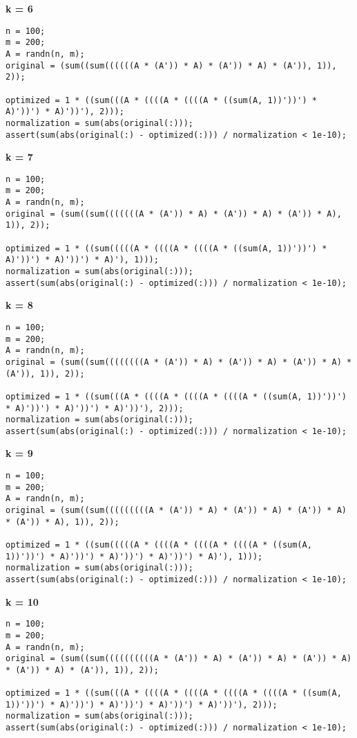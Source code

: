 {\bf k = 6}

\begin{lstlisting}
n = 100;
m = 200;
A = randn(n, m);
original = (sum((sum((((((A * (A')) * A) * (A')) * A) * (A')), 1)), 2));

optimized = 1 * ((sum(((A * ((((A * ((((A * ((sum(A, 1))'))') * A)'))') * A)'))'), 2)));
normalization = sum(abs(original(:)));
assert(sum(abs(original(:) - optimized(:))) / normalization < 1e-10);
\end{lstlisting}


{\bf k = 7}

\begin{lstlisting}
n = 100;
m = 200;
A = randn(n, m);
original = (sum((sum(((((((A * (A')) * A) * (A')) * A) * (A')) * A), 1)), 2));

optimized = 1 * ((sum(((((A * ((((A * ((((A * ((sum(A, 1))'))') * A)'))') * A)'))') * A)'), 1)));
normalization = sum(abs(original(:)));
assert(sum(abs(original(:) - optimized(:))) / normalization < 1e-10);
\end{lstlisting}


{\bf k = 8}

\begin{lstlisting}
n = 100;
m = 200;
A = randn(n, m);
original = (sum((sum((((((((A * (A')) * A) * (A')) * A) * (A')) * A) * (A')), 1)), 2));

optimized = 1 * ((sum(((A * ((((A * ((((A * ((((A * ((sum(A, 1))'))') * A)'))') * A)'))') * A)'))'), 2)));
normalization = sum(abs(original(:)));
assert(sum(abs(original(:) - optimized(:))) / normalization < 1e-10);
\end{lstlisting}


{\bf k = 9}

\begin{lstlisting}
n = 100;
m = 200;
A = randn(n, m);
original = (sum((sum(((((((((A * (A')) * A) * (A')) * A) * (A')) * A) * (A')) * A), 1)), 2));

optimized = 1 * ((sum(((((A * ((((A * ((((A * ((((A * ((sum(A, 1))'))') * A)'))') * A)'))') * A)'))') * A)'), 1)));
normalization = sum(abs(original(:)));
assert(sum(abs(original(:) - optimized(:))) / normalization < 1e-10);
\end{lstlisting}


{\bf k = 10}

\begin{lstlisting}
n = 100;
m = 200;
A = randn(n, m);
original = (sum((sum((((((((((A * (A')) * A) * (A')) * A) * (A')) * A) * (A')) * A) * (A')), 1)), 2));

optimized = 1 * ((sum(((A * ((((A * ((((A * ((((A * ((((A * ((sum(A, 1))'))') * A)'))') * A)'))') * A)'))') * A)'))'), 2)));
normalization = sum(abs(original(:)));
assert(sum(abs(original(:) - optimized(:))) / normalization < 1e-10);
\end{lstlisting}


